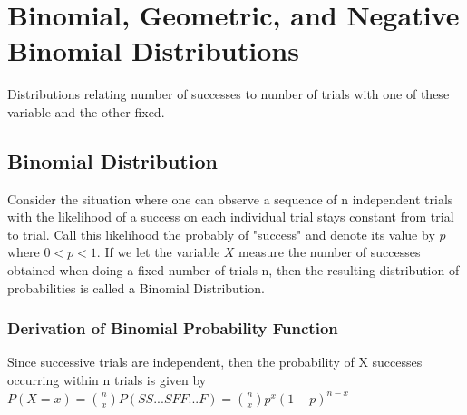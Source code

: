 \documentclass[10pt,]{book}
\theoremstyle{plain}
\theoremstyle{definition}
\theoremstyle{definition}
\theoremstyle{definition}
\numberwithin{equation}{section}
\newcommand{\lt}{ < }
\begin{document}
\chapter[Binomial, Geometric, and Negative Binomial Distributions]{Binomial, Geometric, and Negative Binomial Distributions}\label{BinomNegBinom}
\typeout{************************************************}
\typeout{************************************************}
Distributions relating number of successes to number of trials with one 
	of these variable and the other fixed.%
\typeout{************************************************}
\typeout{************************************************}
\section[Binomial Distribution]{Binomial Distribution}\label{BinomialDistribution}
Consider the situation where one can observe a sequence  of n
	independent trials with the likelihood of a 
	success on each individual trial stays constant from trial to trial.
	Call this likelihood the probably of "success" and 
	denote its value by 
	\(p\) where \( 0 \lt p \lt 1 \).  
	If we let the variable \(X\) measure the number of successes 
	obtained when doing a fixed number of trials n, then the resulting
	distribution of probabilities is called a Binomial Distribution.%
\typeout{************************************************}
\typeout{************************************************}
\subsection[Derivation of Binomial Probability Function]{Derivation of Binomial Probability Function}\label{subsection-16}
 Since successive trials are independent, then the probability of X successes occurring within n 
		trials is given by 
		\(P(X=x) = \binom{n}{x}P(SS...SFF...F) = \binom{n}{x}p^x(1-p)^{n-x}\)%
\typeout{************************************************}
\typeout{************************************************}
\end{document}
